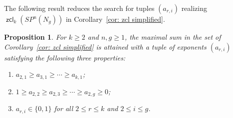 \documentclass[amscd,amssymb,verbatim,10pt]{amsart}
\numberwithin{equation}{section}
\theoremstyle{plain}
\newtheorem{proposition}[thm]{Proposition}
\theoremstyle{definition}
\DeclareMathOperator{\zcl}{{\mathsf{zcl}}}
\begin{document}
The following result reduces the search for tuples $(a_{r,i})$ realizing $\zcl_k(SP^n(N_g))$ in Corollary~\ref{cor: zcl simplified}.

\begin{proposition}\label{prop: zcl search reduced}
For $k\ge 2$ and $n,g\ge 1$, the maximal sum in the set of Corollary~\ref{cor: zcl simplified} is attained with a tuple of exponents $(a_{r,i})$ satisfying the following three properties:
\begin{enumerate}
\item $a_{2,1}\ge a_{3,1}\ge\cdots\ge a_{k,1}$;\label{1}
\item $1\ge a_{2,2}\ge a_{2,3} \ge \cdots\ge a_{2,g}\ge 0$;\label{2}
\item $a_{r,i}\in\{0,1\}$ for all $2\le r\le k$ and $2\le i \le g$.\label{3}
\end{enumerate}
\end{proposition}
\end{document}
